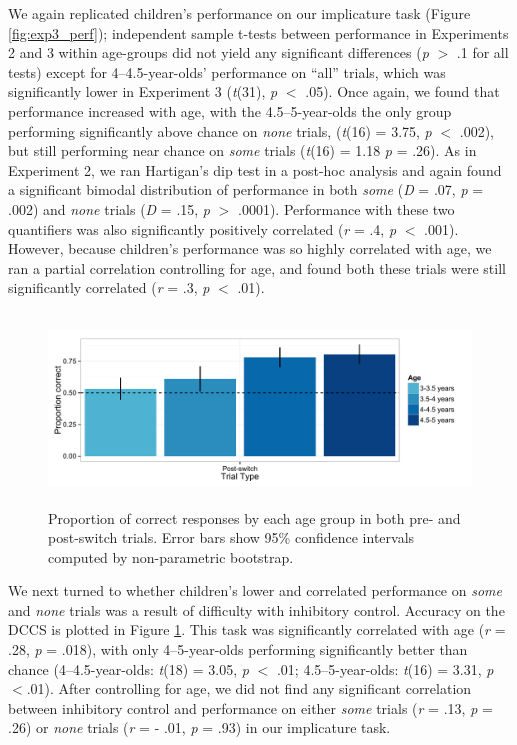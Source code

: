 \documentclass[man]{apa2}
\begin{document}
We again replicated children's performance on our implicature task (Figure \ref{fig:exp3_perf}); independent sample t-tests between performance in Experiments 2 and 3 within age-groups did not yield any significant differences (\emph{p} $>$ .1 for all tests) except for 4--4.5-year-olds' performance on ``all'' trials, which was significantly lower in Experiment 3 (\emph{t}(31), \emph{p} $<$ .05). Once again, we found that performance increased with age, with the 4.5--5-year-olds the only group performing significantly above chance on \emph{none} trials, (\emph{t}(16) = 3.75, \emph{p} $<$ .002), but still performing near chance on \textit{some} trials (\emph{t}(16) = 1.18 \emph{p} = .26). As in Experiment 2, we ran Hartigan's dip test in a post-hoc analysis and again found a significant bimodal distribution of performance in both \textit{some} (\textit{D} = .07, \textit{p} = .002) and \textit{none} trials (\textit{D} = .15, \textit{p} $>$ .0001). Performance with these two quantifiers was also significantly positively correlated (\emph{r} = .4, \emph{p} $<$ .001). However, because children's performance was so highly correlated with age, we ran a partial correlation controlling for age, and found both these trials were still significantly correlated (\emph{r} = .3, \emph{p} $<$ .01). 


\begin{figure} 
 \begin{center} 
  \includegraphics[height=2in]{figures/DCCS.pdf} 
  \caption{\label{fig:exp3_DCCS} Proportion of correct responses by each age group in both pre- and post-switch trials.  Error bars show 95\% confidence intervals computed by non-parametric bootstrap.} 
 \end{center} 
\end{figure}

We next turned to whether children's lower and correlated performance on \emph{some} and \textit{none} trials was a result of difficulty with inhibitory control. Accuracy on the DCCS is plotted in Figure \ref{fig:exp3_DCCS}. This task was significantly correlated with age (\textit{r} = .28, \textit{p} = .018), with only 4--5-year-olds performing significantly better than chance (4--4.5-year-olds: \emph{t}(18) = 3.05, \emph{p} $<$ .01; 4.5--5-year-olds: \emph{t}(16) = 3.31, \emph{p} $< $.01). After controlling for age, we did not find any significant correlation between inhibitory control and performance on either \textit{some} trials (\textit{r} = .13, \textit{p} = .26) or \textit{none} trials (\textit{r} = - .01, \textit{p} = .93) in our implicature task.
\end{document}

